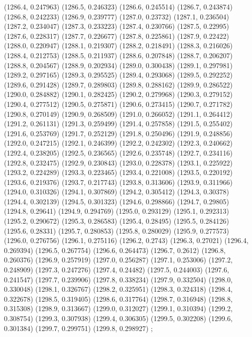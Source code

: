 {					(1286.4, 0.247963)
					(1286.5, 0.246323)
					(1286.6, 0.245514)
					(1286.7, 0.243874)
					(1286.8, 0.242233)
					(1286.9, 0.239777)
					(1287.0, 0.23732)
					(1287.1, 0.236504)
					(1287.2, 0.234047)
					(1287.3, 0.233223)
					(1287.4, 0.230766)
					(1287.5, 0.22995)
					(1287.6, 0.228317)
					(1287.7, 0.226677)
					(1287.8, 0.225861)
					(1287.9, 0.22422)
					(1288.0, 0.220947)
					(1288.1, 0.219307)
					(1288.2, 0.218491)
					(1288.3, 0.216026)
					(1288.4, 0.212753)
					(1288.5, 0.211937)
					(1288.6, 0.207848)
					(1288.7, 0.206207)
					(1288.8, 0.204567)
					(1288.9, 0.202934)
					(1289.0, 0.300438)
					(1289.1, 0.297981)
					(1289.2, 0.297165)
					(1289.3, 0.295525)
					(1289.4, 0.293068)
					(1289.5, 0.292252)
					(1289.6, 0.291428)
					(1289.7, 0.289803)
					(1289.8, 0.288162)
					(1289.9, 0.286522)
					(1290.0, 0.284882)
					(1290.1, 0.282425)
					(1290.2, 0.279968)
					(1290.3, 0.279152)
					(1290.4, 0.277512)
					(1290.5, 0.275871)
					(1290.6, 0.273415)
					(1290.7, 0.271782)
					(1290.8, 0.270149)
					(1290.9, 0.268509)
					(1291.0, 0.266052)
					(1291.1, 0.264412)
					(1291.2, 0.261131)
					(1291.3, 0.259499)
					(1291.4, 0.257858)
					(1291.5, 0.255402)
					(1291.6, 0.253769)
					(1291.7, 0.252129)
					(1291.8, 0.250496)
					(1291.9, 0.248856)
					(1292.0, 0.247215)
					(1292.1, 0.246399)
					(1292.2, 0.242302)
					(1292.3, 0.240662)
					(1292.4, 0.238205)
					(1292.5, 0.236565)
					(1292.6, 0.235748)
					(1292.7, 0.234116)
					(1292.8, 0.232475)
					(1292.9, 0.230843)
					(1293.0, 0.228378)
					(1293.1, 0.225922)
					(1293.2, 0.224289)
					(1293.3, 0.223465)
					(1293.4, 0.221008)
					(1293.5, 0.220192)
					(1293.6, 0.219376)
					(1293.7, 0.217743)
					(1293.8, 0.313606)
					(1293.9, 0.311966)
					(1294.0, 0.310326)
					(1294.1, 0.307869)
					(1294.2, 0.305412)
					(1294.3, 0.30378)
					(1294.4, 0.302139)
					(1294.5, 0.301323)
					(1294.6, 0.298866)
					(1294.7, 0.29805)
					(1294.8, 0.29641)
					(1294.9, 0.294769)
					(1295.0, 0.293129)
					(1295.1, 0.292313)
					(1295.2, 0.290672)
					(1295.3, 0.286583)
					(1295.4, 0.28495)
					(1295.5, 0.284126)
					(1295.6, 0.28331)
					(1295.7, 0.280853)
					(1295.8, 0.280029)
					(1295.9, 0.277573)
					(1296.0, 0.276756)
					(1296.1, 0.275116)
					(1296.2, 0.2743)
					(1296.3, 0.27021)
					(1296.4, 0.269394)
					(1296.5, 0.267754)
					(1296.6, 0.264473)
					(1296.7, 0.2612)
					(1296.8, 0.260376)
					(1296.9, 0.257919)
					(1297.0, 0.256287)
					(1297.1, 0.253006)
					(1297.2, 0.248909)
					(1297.3, 0.247276)
					(1297.4, 0.24482)
					(1297.5, 0.244003)
					(1297.6, 0.241547)
					(1297.7, 0.239906)
					(1297.8, 0.338234)
					(1297.9, 0.332504)
					(1298.0, 0.330048)
					(1298.1, 0.326767)
					(1298.2, 0.325951)
					(1298.3, 0.324318)
					(1298.4, 0.322678)
					(1298.5, 0.319405)
					(1298.6, 0.317764)
					(1298.7, 0.316948)
					(1298.8, 0.315308)
					(1298.9, 0.313667)
					(1299.0, 0.312027)
					(1299.1, 0.310394)
					(1299.2, 0.308754)
					(1299.3, 0.307938)
					(1299.4, 0.306305)
					(1299.5, 0.302208)
					(1299.6, 0.301384)
					(1299.7, 0.299751)
					(1299.8, 0.298927)
				};
